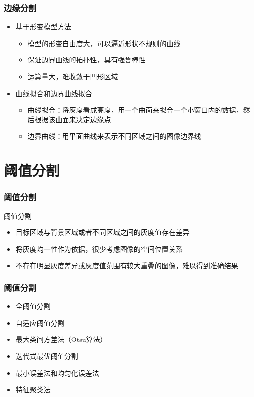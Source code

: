 \documentclass[notheorems,mathserif,table,compress]{beamer}  %
\begin{document}
\begin{frame}
  \frametitle{边缘分割}
  \begin{itemize}
  \item 基于形变模型方法
       \begin{itemize}
       \item 模型的形变自由度大，可以逼近形状不规则的曲线
       \item 保证边界曲线的拓扑性，具有强鲁棒性
       \item 运算量大，难收敛于凹形区域
       \end{itemize}
  \item 曲线拟合和边界曲线拟合
       \begin{itemize}
       \item 曲线拟合：将灰度看成高度，用一个曲面来拟合一个小窗口内的数据，然后根据该曲面来决定边缘点
       \item 边界曲线：用平面曲线来表示不同区域之间的图像边界线
       \end{itemize}
  \end{itemize}
\end{frame}

\section{阈值分割}
\begin{frame}
  \frametitle{阈值分割}
  阈值分割
  \begin{itemize}
  \item 目标区域与背景区域或者不同区域之间的灰度值存在差异
  \item 将灰度均一性作为依据，很少考虑图像的空间位置关系
  \item 不存在明显灰度差异或灰度值范围有较大重叠的图像，难以得到准确结果
  \end{itemize}
\end{frame}


\begin{frame}
  \frametitle{阈值分割}
  \begin{itemize}
  \item 全阈值分割
  \item 自适应阈值分割
  \item 最大类间方差法（Otsu算法）
  \item 迭代式最优阈值分割
  \item 最小误差法和均匀化误差法
  \item 特征聚类法
  \end{itemize}
\end{frame}
\end{document}
